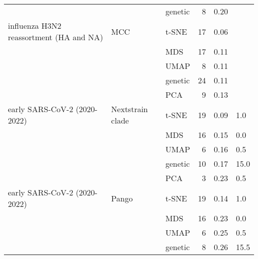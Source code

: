 \begin{tabular}{lllrrl}
                                        &                    & genetic &               8 &                           0.20 &           \\
influenza H3N2 reassortment (HA and NA) &                MCC &   t-SNE &              17 &                           0.06 &           \\
                                        &                    &     MDS &              17 &                           0.11 &           \\
                                        &                    &    UMAP &               8 &                           0.11 &           \\
                                        &                    & genetic &              24 &                           0.11 &           \\
                                        &                    &     PCA &               9 &                           0.13 &           \\
           early SARS-CoV-2 (2020-2022) &   Nextstrain clade &   t-SNE &              19 &                           0.09 &       1.0 \\
                                        &                    &     MDS &              16 &                           0.15 &       0.0 \\
                                        &                    &    UMAP &               6 &                           0.16 &       0.5 \\
                                        &                    & genetic &              10 &                           0.17 &      15.0 \\
                                        &                    &     PCA &               3 &                           0.23 &       0.5 \\
           early SARS-CoV-2 (2020-2022) &              Pango &   t-SNE &              19 &                           0.14 &       1.0 \\
                                        &                    &     MDS &              16 &                           0.23 &       0.0 \\
                                        &                    &    UMAP &               6 &                           0.25 &       0.5 \\
                                        &                    & genetic &               8 &                           0.26 &      15.5 \\

\end{tabular}
